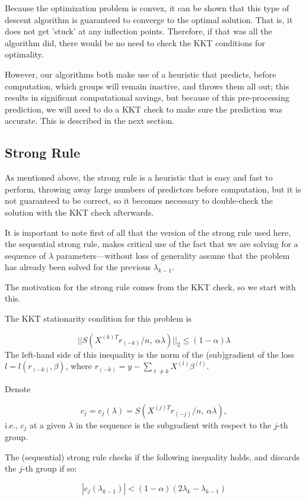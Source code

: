 \documentclass[titlepage]{article}
\begin{document}
Because the optimization problem is convex, it can be shown that this type of descent algorithm is guaranteed to converge to the optimal solution. That is, it does not get 'stuck' at any inflection points. Therefore, if that was all the algorithm did, there would be no need to check the KKT conditions for optimality. 

However, our algorithms both make use of a heuristic that predicts, before computation, which groups will remain inactive, and throws them all out; this results in significant computational savings, but because of this pre-processing prediction, we will need to do a KKT check to make sure the prediction was accurate. This is described in the next section.

\subsection{Strong Rule}

As mentioned above, the strong rule is a heuristic that is easy and fast to perform, throwing away large numbers of predictors before computation, but it is not guaranteed to be correct, so it becomes necessary to double-check the solution with the KKT check afterwards. 

It is important to note first of all that the version of the strong rule used here, the sequential strong rule, makes critical use of the fact that we are solving for a sequence of $\lambda$ parameters---without loss of generality assume that the problem has already been solved for the previous $\lambda_{k-1}$.

The motivation for the strong rule comes from the KKT check, so we start with this.

The KKT stationarity condition for this problem is 

\[
||S(X^{(k)T}r_{(-k)}/n,\ \alpha\lambda)||_2 \leq (1-\alpha)\lambda
\]
The left-hand side of this inequality is the norm of the (sub)gradient of the loss $l = l(r_{(-k)},\beta)$, where $r_{(-k)}= y - \sum_{\ell \neq k} X^{(l)}\beta^{(l)}$.

Denote 

\[
c_j = c_j(\lambda) = S(X^{(j)T}r_{(-j)}/n,\ \alpha\lambda),
\]
i.e., $c_j$ at a given $\lambda$ in the sequence is the subgradient with respect to the $j$-th group.

The (sequential) strong rule checks if the following inequality holds, and discards the $j$-th group if so:

\[
|c_j(\lambda_{k-1})| < (1-\alpha)(2\lambda_k - \lambda_{k-1})
\]
\end{document}
